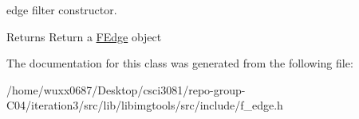 edge filter constructor. 

\begin{DoxyReturn}{Returns}
Return a \hyperlink{classimage__tools_1_1FEdge}{F\+Edge} object 
\end{DoxyReturn}


The documentation for this class was generated from the following file\+:\begin{DoxyCompactItemize}
\item 
/home/wuxx0687/\+Desktop/csci3081/repo-\/group-\/\+C04/iteration3/src/lib/libimgtools/src/include/f\+\_\+edge.\+h\end{DoxyCompactItemize}
